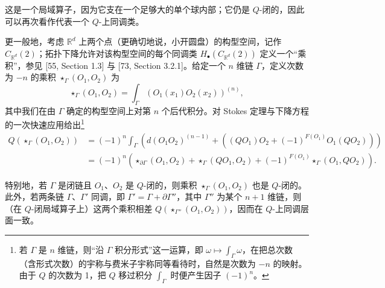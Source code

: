 这是一个局域算子，因为它支在一个足够大的单个球内部；它仍是 $Q$-闭的，因此可以再次看作代表一个 $Q$-上同调类。

更一般地，考虑 $\mathbb{R}^d$ 上两个点（更确切地说，小开圆盘）的构型空间，记作 $C_{\mathbb{R}^d}(2)$；拓扑下降允许对该构型空间的每个同调类 $H_\bullet(C_{\mathbb{R}^d}(2))$ 定义一个“乘积”，参见 [55, Section 1.3] 与 [73, Section 3.2.1]。给定一个 $n$ 维链 $\Gamma$，定义次数为 $-n$ 的乘积 $\star_\Gamma(O_1,O_2)$ 为
\begin{equation}\tag{3.10}
\star_\Gamma(O_1,O_2) = \int_\Gamma (O_1(x_1)O_2(x_2))^{(n)},
\end{equation}
其中我们在由 $\Gamma$ 确定的构型空间上对第 $n$ 个后代积分。对 Stokes 定理与下降方程的一次快速应用给出\footnote{若 $\Gamma$ 是 $n$ 维链，则“沿 $\Gamma$ 积分形式”这一运算，即 $\omega \mapsto \int_\Gamma \omega$，在把总次数（含形式次数）的宇称与费米子宇称同等看待时，自然是次数为 $-n$ 的映射。由于 $Q$ 的次数为 1，把 $Q$ 移过积分 $\int_\Gamma$ 时便产生因子 $(-1)^n$。}
\begin{equation}\tag{3.11}
\begin{aligned}
Q(\star_\Gamma(O_1,O_2))
&= (-1)^n \int_\Gamma \left( d(O_1O_2)^{(n-1)} + \left( (QO_1)O_2 + (-1)^{F(O_1)}O_1(QO_2) \right) \right)\\
&= (-1)^n \left( \star_{\partial\Gamma}(O_1,O_2) + \star_\Gamma(QO_1,O_2) + (-1)^{F(O_1)} \star_\Gamma(O_1,QO_2) \right).
\end{aligned}
\end{equation}

特别地，若 $\Gamma$ 是闭链且 $O_1$、$O_2$ 是 $Q$-闭的，则乘积 $\star_\Gamma(O_1,O_2)$ 也是 $Q$-闭的。此外，若两条链 $\Gamma$、$\Gamma'$ 同调，即 $\Gamma' = \Gamma + \partial\Gamma''$，其中 $\Gamma''$ 为某个 $n+1$ 维链，则（在 $Q$-闭局域算子上）这两个乘积相差 $Q(\star_{\Gamma''}(O_1,O_2))$，因而在 $Q$-上同调层面一致。

